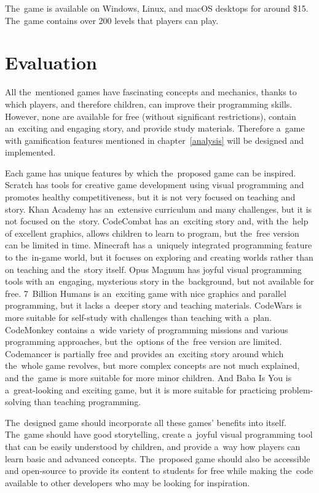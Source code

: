 The~game is available on Windows, Linux, and macOS desktops for around \$15.
The~game contains over 200 levels that players can play.

\section{Evaluation}

All the~mentioned games have fascinating concepts and mechanics, thanks to which players, and therefore children, can improve their programming skills.
However, none are available for free (without significant restrictions), contain an~exciting and engaging story, and provide study materials.
Therefore a~game with gamification features mentioned in chapter~\ref{analysis} will be designed and implemented.

Each game has unique features by which the~proposed game can be inspired.
Scratch has tools for creative game development using visual programming and promotes healthy competitiveness, but it is not very focused on teaching and story.
Khan Academy has an~extensive curriculum and many challenges, but it is not focused on the~story.
CodeCombat has an~exciting story and, with the~help of excellent graphics, allows children to learn to program, but the~free version can be limited in time.
Minecraft has a~uniquely integrated programming feature to the~in-game world, but it focuses on exploring and creating worlds rather than on teaching and the~story itself.
Opus Magnum has joyful visual programming tools with an~engaging, mysterious story in the~background, but not available for free.
7~Billion Humans is an~exciting game with nice graphics and parallel programming, but it lacks a~deeper story and teaching materials.
CodeWars is more suitable for self-study with challenges than teaching with a~plan.
CodeMonkey contains a~wide variety of programming missions and various programming approaches, but the~options of the~free version are limited.
Codemancer is partially free and provides an~exciting story around which the~whole game revolves, but more complex concepts are not much explained, and the~game is more suitable for more minor children.
And Baba Is You is a~great-looking and exciting game, but it is more suitable for practicing problem-solving than teaching programming.

The~designed game should incorporate all these games' benefits into itself.
The~game should have good storytelling, create a~joyful visual programming tool that can be easily understood by children, and provide a~way how players can learn basic and advanced concepts. 
The~proposed game should also be accessible and open-source to provide its content to students for free while making the~code available to other developers who may be looking for inspiration.